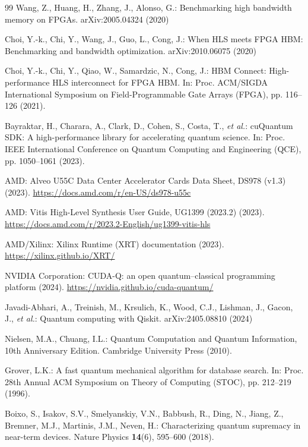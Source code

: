 \begin{thebibliography}{99}
Wang, Z., Huang, H., Zhang, J., Alonso, G.: Benchmarking high bandwidth memory on FPGAs. arXiv:2005.04324 (2020)

Choi, Y.-k., Chi, Y., Wang, J., Guo, L., Cong, J.: When HLS meets FPGA HBM: Benchmarking and bandwidth optimization. arXiv:2010.06075 (2020)

Choi, Y.-k., Chi, Y., Qiao, W., Samardzic, N., Cong, J.: HBM Connect: High-performance HLS interconnect for FPGA HBM. In: Proc. ACM/SIGDA International Symposium on Field-Programmable Gate Arrays (FPGA), pp. 116--126 (2021). 

Bayraktar, H., Charara, A., Clark, D., Cohen, S., Costa, T., \emph{et al.}: cuQuantum SDK: A high-performance library for accelerating quantum science. In: Proc. IEEE International Conference on Quantum Computing and Engineering (QCE), pp. 1050--1061 (2023). 

AMD: Alveo U55C Data Center Accelerator Cards Data Sheet, DS978 (v1.3) (2023). \url{https://docs.amd.com/r/en-US/ds978-u55c}

AMD: Vitis High-Level Synthesis User Guide, UG1399 (2023.2) (2023). \url{https://docs.amd.com/r/2023.2-English/ug1399-vitis-hls}

AMD/Xilinx: Xilinx Runtime (XRT) documentation (2023). \url{https://xilinx.github.io/XRT/}

NVIDIA Corporation: CUDA-Q: an open quantum--classical programming platform (2024). \url{https://nvidia.github.io/cuda-quantum/}

Javadi-Abhari, A., Treinish, M., Krsulich, K., Wood, C.J., Lishman, J., Gacon, J., \emph{et al.}: Quantum computing with Qiskit. arXiv:2405.08810 (2024)

Nielsen, M.A., Chuang, I.L.: Quantum Computation and Quantum Information, 10th Anniversary Edition. Cambridge University Press (2010). 

Grover, L.K.: A fast quantum mechanical algorithm for database search. In: Proc. 28th Annual ACM Symposium on Theory of Computing (STOC), pp. 212--219 (1996). 

Boixo, S., Isakov, S.V., Smelyanskiy, V.N., Babbush, R., Ding, N., Jiang, Z., Bremner, M.J., Martinis, J.M., Neven, H.: Characterizing quantum supremacy in near-term devices. Nature Physics \textbf{14}(6), 595--600 (2018). 


\end{thebibliography}
